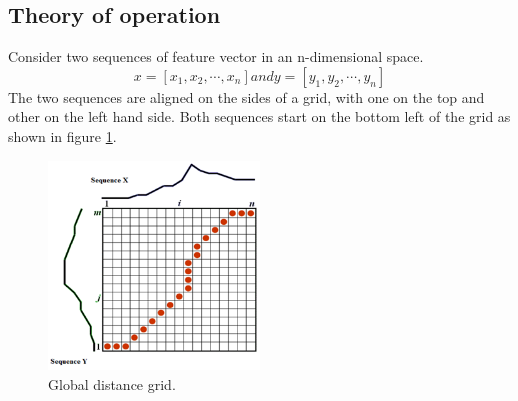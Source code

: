 \documentclass[12pt, a4paper, twoside]{report}
\begin{document}
\subsection{Theory of operation}
Consider two sequences of feature vector in an n-dimensional space.
\begin{equation}
x = [x_1, x_2, \cdots, x_n] and y = [y_1, y_2, \cdots, y_n]
\end{equation}
The two sequences are aligned on the sides of a grid, with one on the top and other on the left hand side. Both sequences start on the bottom left of the grid as shown in figure \ref{fig:dtw-global-dist}.
\begin{figure}[H]
	\centering
	\includegraphics[width=0.5\textwidth]
	{images/chapter4/dtw-global-dist}
	\caption{Global distance grid.}
	\label{fig:dtw-global-dist}
\end{figure}
\end{document}
